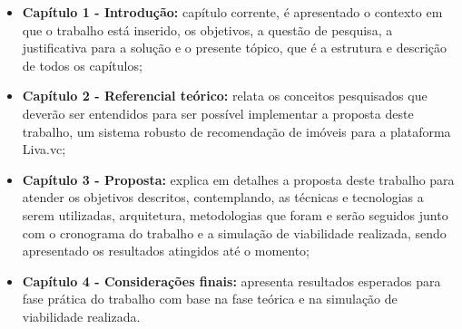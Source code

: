 \begin{itemize}
    \item \textbf{Capítulo 1 - Introdução:} capítulo corrente, é apresentado o contexto em que o trabalho está inserido, os objetivos, a questão de pesquisa, a justificativa para a solução e o presente tópico, que é a estrutura e descrição de todos os capítulos;

    \item \textbf{Capítulo 2 - Referencial teórico:} relata os conceitos pesquisados que deverão ser entendidos para ser possível implementar a proposta deste trabalho, um sistema robusto de recomendação de imóveis para a plataforma Liva.vc;
    
   \item \textbf{Capítulo 3 - Proposta:} explica em detalhes a proposta deste trabalho para atender os objetivos descritos, contemplando, as técnicas e tecnologias a serem utilizadas, arquitetura, metodologias que foram e serão seguidos junto com o cronograma do trabalho e a simulação de viabilidade realizada, sendo apresentado os resultados atingidos até o momento;
   
   \item \textbf{Capítulo 4 - Considerações finais:} apresenta resultados esperados para fase prática do trabalho com base na fase teórica e na simulação de viabilidade realizada.
\end{itemize}
